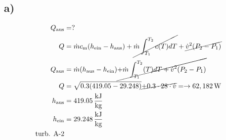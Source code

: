 

\subsection*{a)}
\begin{align*}
Q_{\text{aus}} &= ? \\
Q &= \dot{m} c_{\text{m}} (h_{\text{ein}} - h_{\text{aus}}) + \cancel{\dot{m} \int_{T_1}^{T_2} c(T) dT} + \cancel{\dot{v}^2 (P_2 - P_1)} \\
Q_{\text{aus}} &= \dot{m} (h_{\text{aus}} - h_{\text{ein}}) \cancel{+ \dot{m} \int_{T_1}^{T_2} (T) dT + \dot{v}^2 (P_2 - P_1)} \\
Q &= \sqrt{0.3 (419.05 - 29.248)} \cancel{+ 0.3 \cdot 28 \cdot \dot{v}} = \rightarrow 62,182 \, \text{W} \\
h_{\text{aus}} &= 419.05 \, \frac{\text{kJ}}{\text{kg}} \\
h_{\text{ein}} &= 29.248 \, \frac{\text{kJ}}{\text{kg}} \\
\text{turb. A-2}
\end{align*}